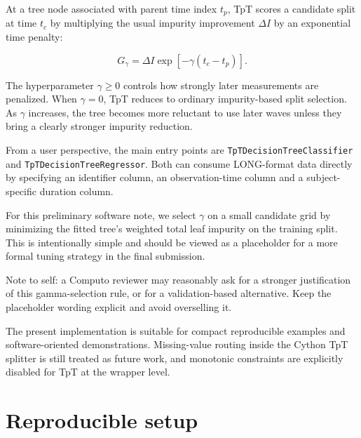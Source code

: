 \documentclass[
  letterpaper,
  DIV=11,
  numbers=noendperiod]{scrartcl}
\begin{document}
At a tree node associated with parent time index \(t_p\), TpT scores a
candidate split at time \(t_c\) by multiplying the usual impurity
improvement \(\Delta I\) by an exponential time penalty:

\[
G_{\gamma} = \Delta I \exp \left[-\gamma (t_c - t_p)\right].
\]

The hyperparameter \(\gamma \ge 0\) controls how strongly later
measurements are penalized. When \(\gamma = 0\), TpT reduces to ordinary
impurity-based split selection. As \(\gamma\) increases, the tree
becomes more reluctant to use later waves unless they bring a clearly
stronger impurity reduction.

From a user perspective, the main entry points are
\texttt{TpTDecisionTreeClassifier} and
\texttt{TpTDecisionTreeRegressor}. Both can consume LONG-format data
directly by specifying an identifier column, an observation-time column
and a subject-specific duration column.

For this preliminary software note, we select \(\gamma\) on a small
candidate grid by minimizing the fitted tree's weighted total leaf
impurity on the training split. This is intentionally simple and should
be viewed as a placeholder for a more formal tuning strategy in the
final submission.

{Note to self: a Computo reviewer may reasonably ask for a stronger
justification of this gamma-selection rule, or for a validation-based
alternative. Keep the placeholder wording explicit and avoid overselling
it.}

\begin{tcolorbox}[enhanced jigsaw, titlerule=0mm, rightrule=.15mm, coltitle=black, opacitybacktitle=0.6, leftrule=.75mm, colback=white, bottomtitle=1mm, toptitle=1mm, opacityback=0, title=\textcolor{quarto-callout-note-color}{\faInfo}\hspace{0.5em}{Current scope}, arc=.35mm, breakable, bottomrule=.15mm, toprule=.15mm, left=2mm, colframe=quarto-callout-note-color-frame, colbacktitle=quarto-callout-note-color!10!white]

The present implementation is suitable for compact reproducible examples
and software-oriented demonstrations. Missing-value routing inside the
Cython TpT splitter is still treated as future work, and monotonic
constraints are explicitly disabled for TpT at the wrapper level.

\end{tcolorbox}

\section{Reproducible setup}\label{reproducible-setup}
\end{document}
